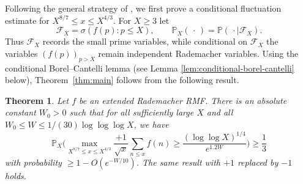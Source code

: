 \documentclass[a4paper,12pt,reqno]{amsart}
\numberwithin{equation}{section}
\newtheorem{theorem}{Theorem}[section]
\theoremstyle{remark}
\newcommand{\p}{\mathbb{P}}
\begin{document}
Following the general strategy of \citet{Harper2023Large}, we first prove
a conditional fluctuation estimate for
\(X^{8/7}\leq x\leq X^{4/3}\). For $X\geq3$ let
\[
 \mathscr F_X=\sigma(f(p):p\leq X),\qquad
 \p_X(\,\cdot\,)=\p(\,\cdot\mid\mathscr F_X).
\]
Thus $\mathscr F_X$ records the small prime variables, while conditional on
$\mathscr F_X$ the variables $(f(p))_{p>X}$ remain independent Rademacher
variables. Using the conditional Borel--Cantelli lemma (see Lemma \ref{lem:conditional-borel-cantelli} below),
Theorem~\ref{thm:main} follows from the following result.


\begin{theorem}
\label{thm:one-scale}
Let $f$ be an extended Rademacher RMF. There is an absolute constant $W_0>0$ such that  for all sufficiently large $X$ and all $W_0\leq W\leq 1/(30)\log\log\log X$, we have
\[
\p_X\bigg(
\max_{X^{8/7}\leq x\leq X^{4/3}}
\frac{+1}{\sqrt{x}}\sum_{n\leq x}f(n)
\geq
\frac{(\log\log X)^{1/4}}{e^{1.2W}}
\bigg)
\geq \frac13
\]
with probability  \( \ge1-O(e^{-W/10})\). The same result with $+1$ replaced by $-1$ holds.
\end{theorem}
\end{document}
